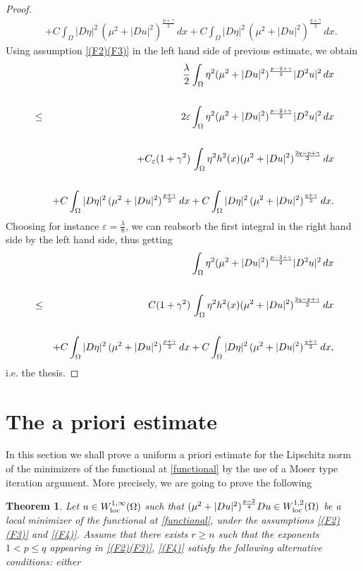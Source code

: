 \documentclass[12pt]{amsart}
\newtheorem{theorem}{Theorem}[section]
\theoremstyle{definition}
\numberwithin{equation}{section}
\def\loc{\rm loc}
\def\loc{\rm loc}
\numberwithin{equation}{section}
\begin{document}
{\begin{proof}
\begin{eqnarray*}
&&+C \int_{\Omega} |D \eta|^2 \,  ({\mu^2} + |Du|^2)^{\frac{p+\gamma}{2}}  \, dx+C \int_{\Omega} |D \eta|^2 \,  ({\mu^2} + |Du|^2)^{\frac{q+\gamma}{2}}  \, dx.
\end{eqnarray*}
Using assumption \eqref{(F2)(F3)} in the left hand side of previous estimate, we obtain
\begin{eqnarray*}
&& \frac{{\lambda}}{2}\int_{\Omega} \eta^2 ({\mu^2} + |Du|^2)^{\frac{p-2+\gamma}{2}}  |D^2 u|^2 \, dx \cr\cr
 &\le &2\varepsilon \int_{\Omega} \eta^2 ({\mu^2} + |Du|^2)^{\frac{p-2+\gamma}{2}}  |D^2 u|^2 \, dx \cr\cr
&&+ C_\varepsilon (1+\gamma^2) \, \int_{\Omega} \eta^2h^2(x)({\mu^2} + |Du|^2)^{\frac{{2 q - p +\gamma}}{2} }\, dx\cr\cr
&&+C \int_{\Omega} |D \eta|^2 \,  ({\mu^2} + |Du|^2)^{\frac{p +\gamma}{2}}  \, dx + C \int_{\Omega} |D \eta|^2 \,  ({\mu^2} + |Du|^2)^{\frac{q +\gamma}{2}}  \, dx.
\end{eqnarray*}
Choosing {for instance} ${\varepsilon=\frac{\lambda }{8}}$, we can reabsorb the first integral in the right hand side by the left hand side, thus getting
\begin{eqnarray*}
&& \int_{\Omega} \eta^2 ({\mu^2} + |Du|^2)^{\frac{p-2+\gamma}{2}}  |D^2 u|^2 \, dx \cr\cr
 &\le & C (1+\gamma^2)  \, \int_{\Omega} \eta^2 h^2(x)({\mu^2} + |Du|^2)^{\frac{{2 q - p +\gamma}}{2} } \, dx\cr\cr
&&+C \int_{\Omega} |D \eta|^2 \,  ({\mu^2} + |Du|^2)^{\frac{p+\gamma}{2}}  \, dx+C \int_{\Omega} |D \eta|^2 \,  ({\mu^2} + |Du|^2)^{\frac{q+\gamma}{2}}  \, dx,
\end{eqnarray*}
i.e. the thesis. %
\end{proof}

\medskip


\section{The a priori estimate}

In this section we shall prove a uniform a priori estimate for the Lipschitz norm of the minimizers of the functional at \eqref{functional} by the use of a Moser type iteration argument. More precisely, we are going to prove the following

\begin{theorem}\label{thmapriori}
Let $u\in W^{1,\infty}_{\loc}(\Omega)$ such that $(\mu^2+|Du|^2)^{\frac{p-2}{4}}Du\in W^{1,2}_{\loc}(\Omega)$ be  a local minimizer of the functional at \eqref{functional}, under the assumptions \eqref{(F2)(F3)} and \eqref{(F4)}. Assume that there exists $r\ge n$ such that the exponents $1<p\le q$ appearing in \eqref{(F2)(F3)}, \eqref{(F4)} satisfy the following alternative conditions: either
   

\end{theorem}}
\end{document}
